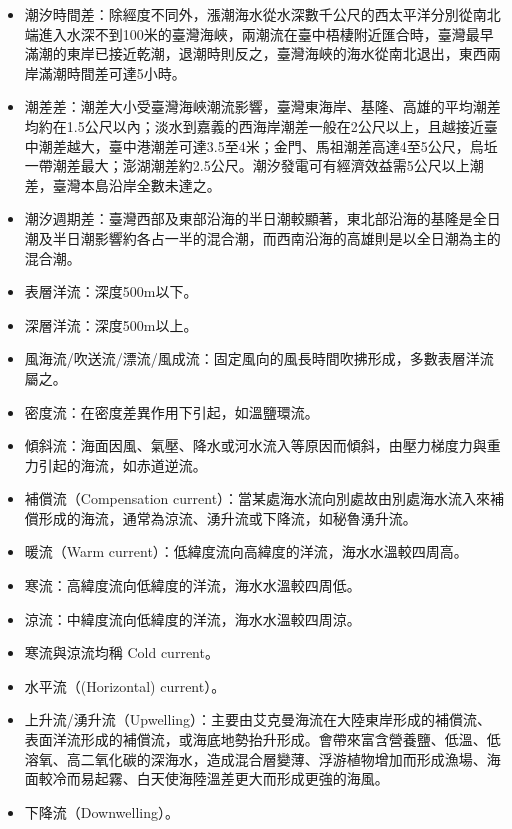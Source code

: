 \documentclass[a4paper,12pt]{report}
\begin{document}
\begin{itemize}
\item 潮汐時間差：除經度不同外，漲潮海水從水深數千公尺的西太平洋分別從南北端進入水深不到100米的臺灣海峽，兩潮流在臺中梧棲附近匯合時，臺灣最早滿潮的東岸已接近乾潮，退潮時則反之，臺灣海峽的海水從南北退出，東西兩岸滿潮時間差可達5小時。
\item 潮差差：潮差大小受臺灣海峽潮流影響，臺灣東海岸、基隆、高雄的平均潮差均約在1.5公尺以內；淡水到嘉義的西海岸潮差一般在2公尺以上，且越接近臺中潮差越大，臺中港潮差可達3.5至4米；金門、馬祖潮差高達4至5公尺，烏坵一帶潮差最大；澎湖潮差約2.5公尺。潮汐發電可有經濟效益需5公尺以上潮差，臺灣本島沿岸全數未達之。
\item 潮汐週期差：臺灣西部及東部沿海的半日潮較顯著，東北部沿海的基隆是全日潮及半日潮影響約各占一半的混合潮，而西南沿海的高雄則是以全日潮為主的混合潮。
\end{itemize}
\begin{itemize}
\item 表層洋流：深度500m以下。
\item 深層洋流：深度500m以上。
\end{itemize}
\begin{itemize}
\item 風海流/吹送流/漂流/風成流：固定風向的風長時間吹拂形成，多數表層洋流屬之。
\item 密度流：在密度差異作用下引起，如溫鹽環流。
\item 傾斜流：海面因風、氣壓、降水或河水流入等原因而傾斜，由壓力梯度力與重力引起的海流，如赤道逆流。
\item 補償流（Compensation current）：當某處海水流向別處故由別處海水流入來補償形成的海流，通常為涼流、湧升流或下降流，如秘魯湧升流。
\end{itemize}
\begin{itemize}
\item 暖流（Warm current）：低緯度流向高緯度的洋流，海水水溫較四周高。
\item 寒流：高緯度流向低緯度的洋流，海水水溫較四周低。
\item 涼流：中緯度流向低緯度的洋流，海水水溫較四周涼。
\item 寒流與涼流均稱 Cold current。
\end{itemize}
\begin{itemize}
\item 水平流（(Horizontal) current）。
\item 上升流/湧升流（Upwelling）：主要由艾克曼海流在大陸東岸形成的補償流、表面洋流形成的補償流，或海底地勢抬升形成。會帶來富含營養鹽、低溫、低溶氧、高二氧化碳的深海水，造成混合層變薄、浮游植物增加而形成漁場、海面較冷而易起霧、白天使海陸溫差更大而形成更強的海風。
\item 下降流（Downwelling）。
\end{itemize}
\end{document}
